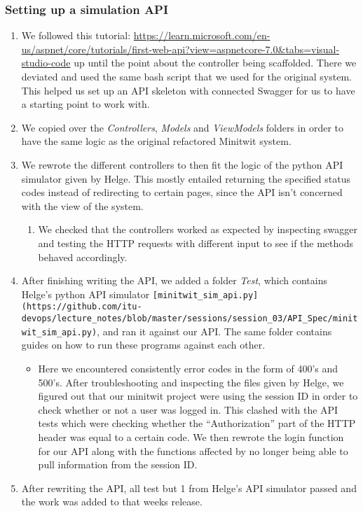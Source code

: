 \subsubsection{Setting up a simulation API}
\label{log:setting-up-a-simulation-api}

\begin{enumerate}
    \item We followed this tutorial: \url{https://learn.microsoft.com/en-us/aspnet/core/tutorials/first-web-api?view=aspnetcore-7.0\&tabs=visual-studio-code} up until the point about the controller being scaffolded. There we deviated and used the same bash script that we used for the original system. This helped us set up an API skeleton with connected Swagger for us to have a starting point to work with.
    \item We copied over the \emph{Controllers}, \emph{Models} and \emph{ViewModels} folders in order to have the same logic as the original refactored Minitwit system.
    \item We rewrote the different controllers to then fit the logic of the python API simulator given by Helge. This mostly entailed returning the specified status codes instead of redirecting to certain pages, since the API isn't concerned with the view of the system.

    \begin{enumerate}
        \item We checked that the controllers worked as expected by inspecting swagger and testing the HTTP requests with different input to see if the methods behaved accordingly.
    \end{enumerate}
    \item After finishing writing the API, we added a folder \emph{Test}, which contains Helge's python API simulator \texttt{{[}minitwit\_sim\_api.py{]}(https://github.com/itu-devops/lecture\_notes/blob/master/sessions/session\_03/API\_Spec/minitwit\_sim\_api.py)}, and ran it against our API. The same folder contains guides on how to run these programs against each other.

    \begin{itemize}
        \item Here we encountered consistently error codes in the form of 400's and 500's. After troubleshooting and inspecting the files given by Helge, we figured out that our minitwit project were using the session ID in order to check whether or not a user was logged in. This clashed with the API tests which were checking whether the ``Authorization'' part of the HTTP header was equal to a certain code. We then rewrote the login function for our API along with the functions affected by no longer being able to pull information from the session ID.
    \end{itemize}

    \item After rewriting the API, all test but 1 from Helge's API simulator passed and the work was added to that weeks release.
\end{enumerate}

